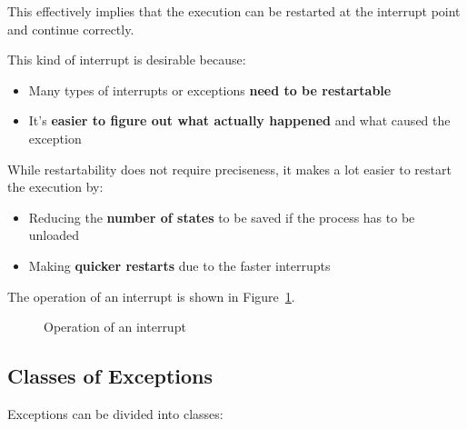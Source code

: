 \documentclass[english]{article}
\begin{document}
This effectively implies that the execution can be restarted at the interrupt point and continue correctly.

\bigskip
This kind of interrupt is desirable because:

\begin{itemize}
  \item Many types of interrupts or exceptions \textbf{need to be restartable}
  \item It's \textbf{easier to figure out what actually happened} and what caused the exception
\end{itemize}

While restartability does not require preciseness, it makes a lot easier to restart the execution by:

\begin{itemize}
  \item Reducing the \textbf{number of states} to be saved if the process has to be unloaded
  \item Making \textbf{quicker restarts} due to the faster interrupts
\end{itemize}

\bigskip
The operation of an interrupt is shown in Figure~\ref{fig:operation-interrupt}.

\begin{figure}
  \bigskip
  \centering
  \caption{Operation of an interrupt}
  \label{fig:operation-interrupt}
  \bigskip
\end{figure}

\subsection{Classes of Exceptions}

Exceptions can be divided into classes:
\end{document}
